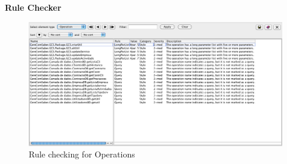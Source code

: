 \textbf{Rule Checker}
\begin{figure}[H]
\begin{center}
\includegraphics[width=1\textwidth]{images/rule.png}
\caption{Rule checking for Operations}\label{img:rule}
\end{center}
\end{figure} 
